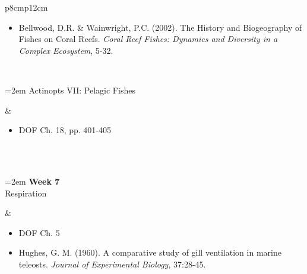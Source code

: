 \documentclass[letterpaper]{inzane_syllabus} %
\begin{document}
\begin{center}
\begin{tabularx}{\textwidth}{p{8cm}p{12cm}}
\begin{minipage}[t]{\linewidth}%
\begin{itemize}
\vspace{5pt}
\item Bellwood, D.R. \& Wainwright, P.C. (2002). The History and Biogeography of Fishes on Coral Reefs. \textit{Coral Reef Fishes: Dynamics and Diversity in a Complex Ecosystem}, 5-32. \\
\end{itemize} 
\end{minipage}\\

\begin{minipage}[t]{\linewidth}%
\hangindent=2em
\hspace{2em}\textbullet Actinopts VII: Pelagic Fishes \\
\end{minipage} & 
 
\begin{minipage}[t]{\linewidth}%
\begin{itemize}
\item  DOF Ch. 18, pp. 401-405  \\
\end{itemize} 
\end{minipage}\\


\hline
{} \\
\hline

 \begin{minipage}[t]{\linewidth}%
\hangindent=2em
\textbf{Week 7} \\
\textbullet Respiration \\
\end{minipage} & 
 
\begin{minipage}[t]{\linewidth}%
\begin{itemize}
\vspace{5pt}
\item DOF Ch. 5
\item Hughes, G. M. (1960). A comparative study of gill ventilation in marine teleosts. \textit{Journal of Experimental Biology}, 37:28-45.\vspace{5pt}
\end{itemize} 
\end{minipage}\\


\end{tabularx}
\end{center}
\end{document}
